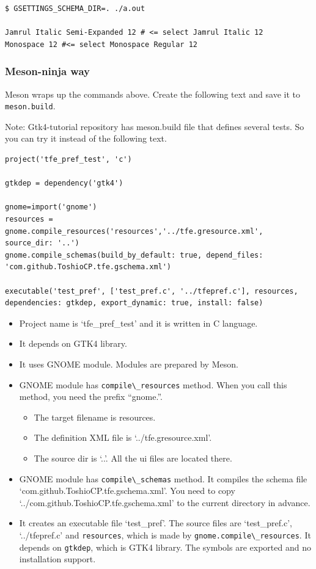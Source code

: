 \begin{lstlisting}
$ GSETTINGS_SCHEMA_DIR=. ./a.out

Jamrul Italic Semi-Expanded 12 # <= select Jamrul Italic 12
Monospace 12 #<= select Monospace Regular 12
\end{lstlisting}

\subsubsection{Meson-ninja way}\label{meson-ninja-way}

Meson wraps up the commands above. Create the following text and save it
to \passthrough{\lstinline!meson.build!}.

Note: Gtk4-tutorial repository has meson.build file that defines several
tests. So you can try it instead of the following text.

\begin{lstlisting}
project('tfe_pref_test', 'c')

gtkdep = dependency('gtk4')

gnome=import('gnome')
resources = gnome.compile_resources('resources','../tfe.gresource.xml', source_dir: '..')
gnome.compile_schemas(build_by_default: true, depend_files: 'com.github.ToshioCP.tfe.gschema.xml')

executable('test_pref', ['test_pref.c', '../tfepref.c'], resources, dependencies: gtkdep, export_dynamic: true, install: false)
\end{lstlisting}

\begin{itemize}
\tightlist
\item
  Project name is `tfe\_pref\_test' and it is written in C language.
\item
  It depends on GTK4 library.
\item
  It uses GNOME module. Modules are prepared by Meson.
\item
  GNOME module has \passthrough{\lstinline!compile\_resources!} method.
  When you call this method, you need the prefix ``gnome.''.

  \begin{itemize}
  \tightlist
  \item
    The target filename is resources.
  \item
    The definition XML file is `../tfe.gresource.xml'.
  \item
    The source dir is `..'. All the ui files are located there.
  \end{itemize}
\item
  GNOME module has \passthrough{\lstinline!compile\_schemas!} method. It
  compiles the schema file `com.github.ToshioCP.tfe.gschema.xml'. You
  need to copy `../com.github.ToshioCP.tfe.gschema.xml' to the current
  directory in advance.
\item
  It creates an executable file `test\_pref'. The source files are
  `test\_pref.c', `../tfepref.c' and
  \passthrough{\lstinline!resources!}, which is made by
  \passthrough{\lstinline!gnome.compile\_resources!}. It depends on
  \passthrough{\lstinline!gtkdep!}, which is GTK4 library. The symbols
  are exported and no installation support.
\end{itemize}

